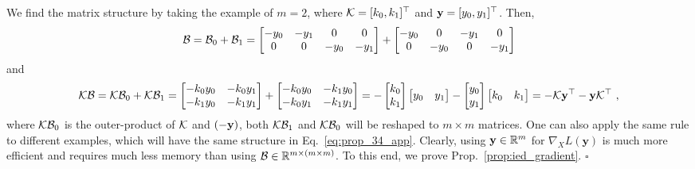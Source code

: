 We find the matrix structure by taking the example of $m=2$, where $\mathcal{K}=[ k_0, k_1 ]^\top$ and $\mathbf{y} = [ y_0, y_1 ]^\top$.
Then,
%
\begin{equation}
\mathcal{B}
= \mathcal{B}_0 + \mathcal{B}_1
= \begin{bmatrix}
-y_0 & -y_1 & 0 & 0 \\
0 & 0 & -y_0 & -y_1
\end{bmatrix}
+
\begin{bmatrix}
-y_0 & 0 & -y_1 & 0 \\
0 & -y_0 & 0 & -y_1
\end{bmatrix}
\end{equation}
%
and
%
\begin{equation}
\mc{K} \mc{B}
= \mc{K} \mc{B}_0 + \mc{K} \mc{B}_1 =
\begin{bmatrix}
-k_0 y_0 & -k_0 y_1 \\
-k_1 y_0 & -k_1 y_1
\end{bmatrix}
+
\begin{bmatrix}
-k_0 y_0 & -k_1 y_0 \\
-k_0 y_1 & -k_1 y_1
\end{bmatrix}
=
-\begin{bmatrix}
k_0\\
k_1
\end{bmatrix}
%
\begin{bmatrix}
y_0 & y_1
\end{bmatrix}
-
\begin{bmatrix}
y_0\\
y_1
\end{bmatrix}
%
\begin{bmatrix}
k_0 & k_1
\end{bmatrix}
=
- \mc{K} \mb{y}^\top - \mb{y} \mc{K}^\top\ ,
\end{equation}
%
where $\mathcal{K} \mathcal{B}_0$ is the outer-product of $\mathcal{K}$ and $(-\mathbf{y})$, both $\mathcal{K} \mathcal{B}_1$ and $\mathcal{K} \mathcal{B}_0$ will be reshaped to $m \times m$ matrices.
One can also apply the same rule to different examples, which will have the same
structure in Eq.~\eqref{eq:prop_34_app}.
Clearly, using $\mathbf{y} \in \mathbb{R}^{m}$ for $\nabla_X L(\mathbf{y})$ is much more efficient and requires much less memory than using $\mathcal{B} \in \mathbb{R}^{m \times (m \times m)}$.
%
To this end, we prove Prop.~\ref{prop:ied_gradient}. $\square$

